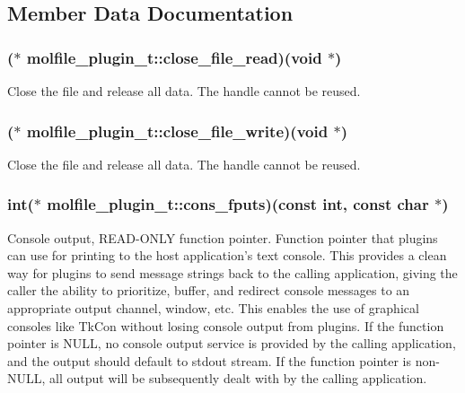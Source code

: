 \subsection{\-Member \-Data \-Documentation}
\hypertarget{structmolfile__plugin__t_a2fbc2c1623f4453c8bd95548e6c5de53}{
\subsubsection[{close\-\_\-file\-\_\-read}]{($\ast$  {\bf molfile\-\_\-plugin\-\_\-t\-::close\-\_\-file\-\_\-read})({\bf void} $\ast$)}}\label{structmolfile__plugin__t_a2fbc2c1623f4453c8bd95548e6c5de53}
\-Close the file and release all data. \-The handle cannot be reused. \hypertarget{structmolfile__plugin__t_a69455eb95d6093deba833b47b9c60c2c}{
\subsubsection[{close\-\_\-file\-\_\-write}]{($\ast$  {\bf molfile\-\_\-plugin\-\_\-t\-::close\-\_\-file\-\_\-write})({\bf void} $\ast$)}}\label{structmolfile__plugin__t_a69455eb95d6093deba833b47b9c60c2c}
\-Close the file and release all data. \-The handle cannot be reused. \hypertarget{structmolfile__plugin__t_a190dffaa87f1debfa44a24aef6868365}{
\subsubsection[{cons\-\_\-fputs}]{\setlength{\rightskip}{0pt plus 5cm}int($\ast$  {\bf molfile\-\_\-plugin\-\_\-t\-::cons\-\_\-fputs})(const int, const char $\ast$)}}\label{structmolfile__plugin__t_a190dffaa87f1debfa44a24aef6868365}
\-Console output, \-R\-E\-A\-D-\/\-O\-N\-L\-Y function pointer. \-Function pointer that plugins can use for printing to the host application's text console. \-This provides a clean way for plugins to send message strings back to the calling application, giving the caller the ability to prioritize, buffer, and redirect console messages to an appropriate output channel, window, etc. \-This enables the use of graphical consoles like \-Tk\-Con without losing console output from plugins. \-If the function pointer is \-N\-U\-L\-L, no console output service is provided by the calling application, and the output should default to stdout stream. \-If the function pointer is non-\/\-N\-U\-L\-L, all output will be subsequently dealt with by the calling application.

